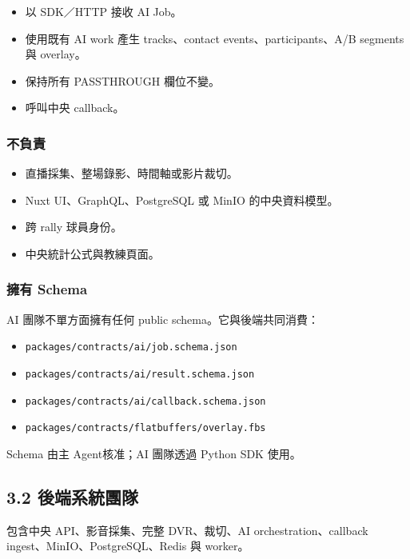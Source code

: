 \documentclass[
  9pt,
  a4paper,
]{article}
\providecommand{\tightlist}{%
  \setlength{\itemsep}{0pt}\setlength{\parskip}{0pt}}
\begin{document}
\begin{itemize}
\tightlist
\item
  以 SDK／HTTP 接收 AI Job。
\item
  使用既有 AI work 產生 tracks、contact events、participants、A/B
  segments 與 overlay。
\item
  保持所有 PASSTHROUGH 欄位不變。
\item
  呼叫中央 callback。
\end{itemize}

\subsubsection{不負責}\label{ux4e0dux8ca0ux8cac}

\begin{itemize}
\tightlist
\item
  直播採集、整場錄影、時間軸或影片裁切。
\item
  Nuxt UI、GraphQL、PostgreSQL 或 MinIO 的中央資料模型。
\item
  跨 rally 球員身份。
\item
  中央統計公式與教練頁面。
\end{itemize}

\subsubsection{擁有 Schema}\label{ux64c1ux6709-schema}

AI 團隊不單方面擁有任何 public schema。它與後端共同消費：

\begin{itemize}
\tightlist
\item
  \texttt{packages/contracts/ai/job.schema.json}
\item
  \texttt{packages/contracts/ai/result.schema.json}
\item
  \texttt{packages/contracts/ai/callback.schema.json}
\item
  \texttt{packages/contracts/flatbuffers/overlay.fbs}
\end{itemize}

Schema 由主 Agent核准；AI 團隊透過 Python SDK 使用。

\subsection{3.2
後端系統團隊}\label{32-ux5f8cux7aefux7cfbux7d71ux5718ux968a}

包含中央 API、影音採集、完整 DVR、裁切、AI orchestration、callback
ingest、MinIO、PostgreSQL、Redis 與 worker。
\end{document}
